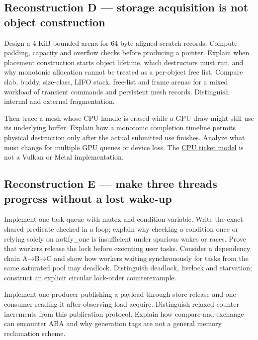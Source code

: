 \subsection{Reconstruction D --- storage acquisition is not object construction}\label{appendix-2587680a4fe3-reconstruction-d-storage-acquisition-is-not-object-construction}

\hypertarget{appendix-2587680a4fe3-reconstruction-d-storage-acquisition-is-not-object-construction}{}

Design a 4-KiB bounded arena for 64-byte aligned scratch records. Compute padding, capacity and overflow checks before producing a pointer. Explain when placement construction starts object lifetime, which destructors must run, and why monotonic allocation cannot be treated as a per-object free list. Compare slab, buddy, size-class, LIFO stack, free-list and frame arenas for a mixed workload of transient commands and persistent mesh records. Distinguish internal and external fragmentation.

Then trace a mesh whose CPU handle is erased while a GPU draw might still use its underlying buffer. Explain how a monotonic completion timeline permits physical destruction only after the actual submitted use finishes. Analyze what must change for multiple GPU queues or device loss. The \hyperref[source-file-0060a91bd24dd25d6c14e679]{CPU ticket model} is not a Vulkan or Metal implementation.

\subsection{Reconstruction E --- make three threads progress without a lost wake-up}\label{appendix-2587680a4fe3-reconstruction-e-make-three-threads-progress-without-a-lost-wake-up}

\hypertarget{appendix-2587680a4fe3-reconstruction-e-make-three-threads-progress-without-a-lost-wake-up}{}

Implement one task queue with mutex and condition variable. Write the exact shared predicate checked in a loop; explain why checking a condition once or relying solely on notify\_one is insufficient under spurious wakes or races. Prove that workers release the lock before executing user tasks. Consider a dependency chain A→B→C and show how workers waiting synchronously for tasks from the same saturated pool may deadlock. Distinguish deadlock, livelock and starvation; construct an explicit circular lock-order counterexample.

Implement one producer publishing a payload through store-release and one consumer reading it after observing load-acquire. Distinguish relaxed counter increments from this publication protocol. Explain how compare-and-exchange can encounter ABA and why generation tags are not a general memory reclamation scheme.

